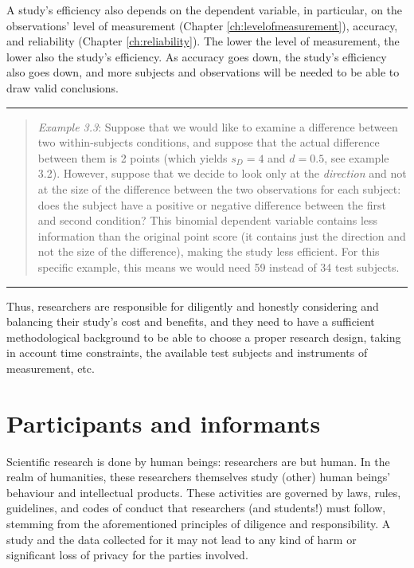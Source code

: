 \documentclass[
]{book}
\begin{document}
A study's efficiency also depends on the dependent variable, in particular, on the observations' level of measurement (Chapter \ref{ch:levelofmeasurement}), accuracy, and reliability (Chapter \ref{ch:reliability}). The lower the level of measurement, the lower also the study's efficiency. As accuracy goes down, the study's efficiency also goes down, and more subjects and observations will be needed to be able to draw valid conclusions.

\begin{center}\rule{0.5\linewidth}{0.5pt}\end{center}

\begin{quote}
\emph{Example 3.3}: Suppose that we would like to examine a difference between two within-subjects conditions, and suppose that the actual difference between them is 2 points (which yields \(s_D = 4\) and \(d = 0.5\), see example 3.2). However, suppose that we decide to look only at the \emph{direction} and not at the size of the difference between the two observations for each subject: does the subject have a positive or negative difference between the first and second condition? This binomial dependent variable contains less information than the original point score (it contains just the direction and not the size of the difference), making the study less efficient. For this specific example, this means we would need 59 instead of 34 test subjects.
\end{quote}

\begin{center}\rule{0.5\linewidth}{0.5pt}\end{center}

Thus, researchers are responsible for diligently and honestly considering and balancing their study's cost and benefits, and they need to have a sufficient methodological background to be able to choose a proper research design, taking in account time constraints, the available test subjects and instruments of measurement, etc.

\hypertarget{participants-and-informants}{%
\section{Participants and informants}\label{participants-and-informants}}

Scientific research is done by human beings: researchers are but human. In the realm of humanities, these researchers themselves study (other) human beings' behaviour and intellectual products. These activities are governed by laws, rules, guidelines, and codes of conduct that researchers (and students!) must follow, stemming from the aforementioned principles of diligence and responsibility. A study and the data collected for it may not lead to any kind of harm or significant loss of privacy for the parties involved.
\end{document}
